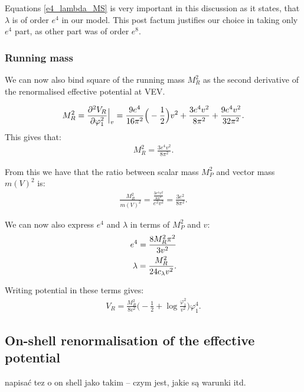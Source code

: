 Equations \ref{e4_lambda_MS} is very important in this discussion as it states, that $\lambda$ 
is of order $e^4$ in our model. This post factum justifies our 
choice in taking only $e^4$ part, as other part was of order $e^8$. \\

\subsubsection{Running mass}\label{MSbar running mass}
We can now also bind square of the running mass $M_R^2$ as the second derivative of the 
renormalised effective potential at VEV.

\begin{align}
M_R^2 = \frac{\partial^2 V_R}{\partial \varphi_1^2} \Big|_v = \frac{9e^4}{16\pi^2}\Big(-\frac{1}{2}\Big)v^2+\frac{3e^4v^2}{8\pi^2} 
+\frac{9e^4v^2}{32\pi^2}.
\end{align}
This gives that:
\begin{align}
M_R^2 = \frac{3e^4v^2}{8\pi^2}.
\end{align}

From this we have that the ratio between scalar mass $M_P^2$ and vector mass $m(V)^2$ is:
\begin{align}
\frac{M_R^2}{m(V)^2} = \frac{\frac{3e^4v^2}{8\pi^2}}{e^2v^2} = \frac{3e^2}{8\pi^2}.
\end{align}

We can now also express $e^4$ and $\lambda$ in terms of $M_P^2$ and $v$:
\begin{align}
e^4 = \frac{8M_R^2\pi^2}{3v^2} \\
\lambda = \frac{M_R^2}{24c_\lambda v^2}.
\end{align}

Writing potential in these terms gives:
\begin{align}
V_R = \frac{M_R^2}{8v^2}\Big(-\frac{1}{2}+\log\frac{\varphi_1^2}{v^2}\Big)\varphi_1^4.
\end{align}


\subsection{On-shell renormalisation of the effective potential}
napisać tez o on shell jako takim -- czym jest, jakie są warunki itd.














